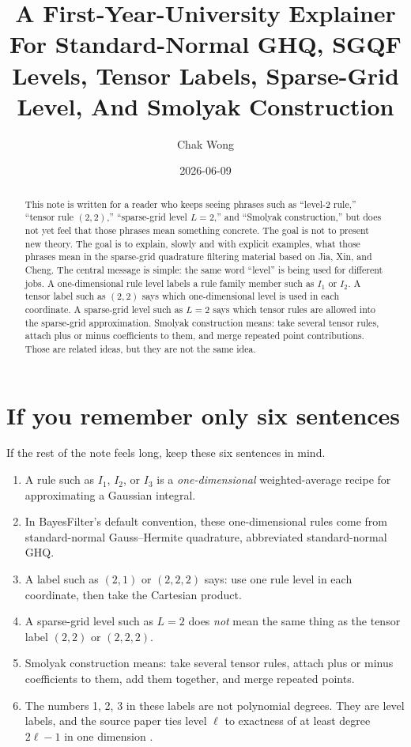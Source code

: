 \documentclass[11pt]{article}
\title{A First-Year-University Explainer For Standard-Normal GHQ, SGQF Levels, Tensor Labels, Sparse-Grid Level, And Smolyak Construction}
\author{Chak Wong}
\date{2026-06-09}
\begin{document}
\maketitle

\begin{abstract}
This note is written for a reader who keeps seeing phrases such as
``level-2 rule,'' ``tensor rule \((2,2)\),'' ``sparse-grid level \(L=2\),'' and
``Smolyak construction,'' but does not yet feel that those phrases mean
something concrete.  The goal is not to present new theory.  The goal is to
explain, slowly and with explicit examples, what those phrases mean in the
sparse-grid quadrature filtering material based on Jia, Xin, and Cheng.  The
central message is simple: the same word ``level'' is being used for different
jobs.  A one-dimensional rule level labels a rule family member such as \(I_1\)
or \(I_2\).  A tensor label such as \((2,2)\) says which one-dimensional level
is used in each coordinate.  A sparse-grid level such as \(L=2\) says which
tensor rules are allowed into the sparse-grid approximation.  Smolyak
construction means: take several tensor rules, attach plus or minus coefficients
to them, and merge repeated point contributions.  Those are related ideas, but
they are not the same idea.
\end{abstract}

\tableofcontents

\section{If you remember only six sentences}
\label{sec:six-sentences}

If the rest of the note feels long, keep these six sentences in mind.
\begin{enumerate}[leftmargin=0.28in]
  \item A rule such as \(I_1\), \(I_2\), or \(I_3\) is a \emph{one-dimensional}
  weighted-average recipe for approximating a Gaussian integral.
  \item In BayesFilter's default convention, these one-dimensional rules come
  from standard-normal Gauss--Hermite quadrature, abbreviated standard-normal
  GHQ.
  \item A label such as \((2,1)\) or \((2,2,2)\) says: use one rule level in
  each coordinate, then take the Cartesian product.
  \item A sparse-grid level such as \(L=2\) does \emph{not} mean the same thing
  as the tensor label \((2,2)\) or \((2,2,2)\).
  \item Smolyak construction means: take several tensor rules, attach plus or
  minus coefficients to them, add them together, and merge repeated points.
  \item The numbers 1, 2, 3 in these labels are not polynomial degrees.  They
  are level labels, and the source paper ties level \(\ell\) to exactness of at
  least degree \(2\ell-1\) in one dimension \cite{jia2012sparsegrid}.
\end{enumerate}
\end{document}
